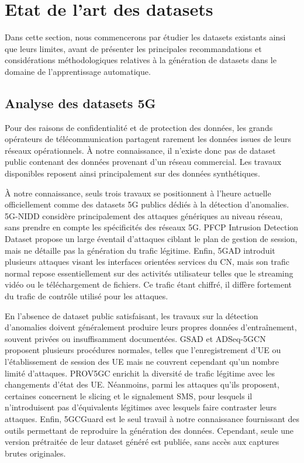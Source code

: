 \documentclass[a4paper,11pt,twoside]{StyleThese}
\begin{document}
\section{Etat de l'art des datasets}
Dans cette section, nous commencerons par étudier les datasets existants ainsi que leurs limites, avant de présenter les principales recommandations et considérations méthodologiques relatives à la génération de datasets dans le domaine de l’apprentissage automatique.

\subsection{Analyse des datasets 5G}
Pour des raisons de confidentialité et de protection des données, les grands opérateurs de télécommunication partagent rarement les données issues de leurs réseaux opérationnels. À notre connaissance, il n’existe donc pas de dataset public contenant des données provenant d'un réseau commercial. Les travaux disponibles reposent ainsi principalement sur des données synthétiques.

À notre connaissance, seuls trois travaux se positionnent à l'heure actuelle officiellement comme des datasets 5G publics dédiés à la détection d’anomalies. 5G-NIDD \cite{5g_nidd} considère principalement des attaques génériques au niveau réseau, sans prendre en compte les spécificités des réseaux 5G. PFCP Intrusion Detection Dataset \cite{amponis20235g} propose un large éventail d’attaques ciblant le plan de gestion de session, mais ne détaille pas la génération du trafic légitime. Enfin, 5GAD \cite{5gad} introduit plusieurs attaques visant les interfaces orientées services du CN, mais son trafic normal repose essentiellement sur des activités utilisateur telles que le streaming vidéo ou le téléchargement de fichiers. Ce trafic étant chiffré, il diffère fortement du trafic de contrôle utilisé pour les attaques.

En l’absence de dataset public satisfaisant, les travaux sur la détection d’anomalies doivent généralement produire leurs propres données d’entraînement, souvent privées ou insuffisamment documentées. GSAD \cite{gsad} et ADSeq-5GCN \cite{adseq} proposent plusieurs procédures normales, telles que l’enregistrement d'UE ou l’établissement de session des UE mais ne couvrent cependant qu’un nombre limité d’attaques. PROV5GC \cite{prov5g} enrichit la diversité de trafic légitime avec les changements d’état des UE. Néanmoins, parmi les attaques qu'ils proposent, certaines concernent le slicing et le signalement SMS, pour lesquels il n’introduisent pas d’équivalents légitimes avec lesquels faire contraster leurs attaques. Enfin, 5GCGuard \cite{5GCGuard} est le seul travail à notre connaissance fournissant des outils permettant de reproduire la génération des données. Cependant, seule une version prétraitée de leur dataset généré est publiée, sans accès aux captures brutes originales.
\end{document}
